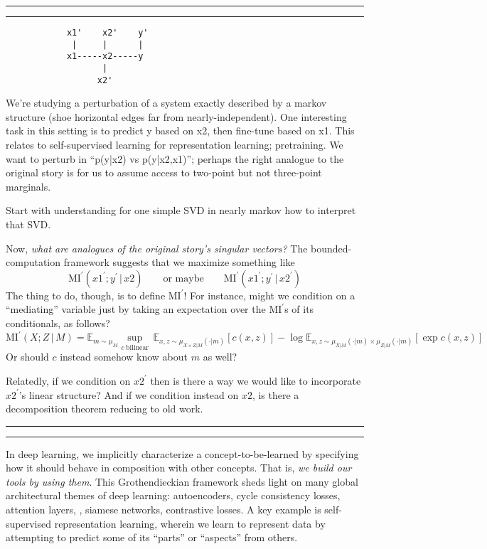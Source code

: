 \documentclass[11pt, justified]{tufte-book}
\newcommand{\pr}{\prime}
\newcommand{\MI}{\text{MI}}
\newcommand{\Ee}{\mathbb{E}}\newcommand{\eE}{\mathcal{E}}
\theoremstyle{definition}
\begin{document}
\vspace{0.5cm}
\hrule
\vspace{0.1cm}
\hrule
\vspace{0.1cm}

    \begin{verbatim}
            x1'    x2'    y'
             |     |      |
            x1-----x2-----y
                   |
                  x2'
    \end{verbatim}
    We're studying a perturbation of a system exactly described by a markov
    structure (shoe horizontal edges far from nearly-independent).  One
    interesting task in this setting is to predict y based on x2, then
    fine-tune based on x1.  This relates to self-supervised learning for
    representation learning; pretraining.  
    We want to perturb in ``p(y|x2) vs p(y|x2,x1)''; perhaps the right analogue
    to the original story is for us to assume access to two-point but not
    three-point marginals.

    Start with understanding for one simple SVD in nearly markov how to
    interpret that SVD.

    Now, \emph{what are analogues of the original story's singular vectors?}
    The bounded-computation framework suggests that we maximize something like
    $$
        \MI^\pr(x1^\pr;y^\pr \,|\, x2)
        \quad
        \quad
        \text{or maybe}
        \quad
        \quad
        \MI^\pr(x1^\pr;y^\pr \,|\, x2^\pr)
    $$
    The thing to do, though, is to define $\MI^\pr$!
    For instance, might we condition on a ``mediating'' variable just by taking
    an expectation over the $\MI^\pr$s of its conditionals, as follows?
    $$
      \MI^\pr(X;Z\,|\,M) = \Ee_{m\sim \mu_{M}} \sup_{c~\text{bilinear}}\,
      \Ee_{x,z \sim \mu_{X\times Z|M}(\cdot|m)} \left[
        c(x,z)
      \right]
      -
      \log
      \Ee_{x,z \sim \mu_{X|M}(\cdot|m) \times \mu_{Z|M}(\cdot|m)} \left[
      \exp
        c(x,z)
      \right]
    $$
    Or should $c$ instead somehow know about $m$ as well?

    Relatedly, if we condition on $x2^\pr$ then is there a way we would
    like to incorporate $x2^\pr$'s linear structure?
    And if we condition instead on $x2$, is there a decomposition theorem reducing to old work.


\vspace{0.1cm}
\hrule
\vspace{0.1cm}
\hrule
\vspace{0.5cm}


  In deep learning, we implicitly characterize a concept-to-be-learned by
  specifying how it should behave in composition with other concepts.  That is,
  \emph{we build our tools by using them}.  This Grothendieckian framework
  sheds light on many global architectural themes of deep learning:
  autoencoders, cycle consistency losses, attention layers, , siamese networks,
  contrastive losses.  A key example is self-supervised representation
  learning, wherein we learn to represent data by attempting to predict some
  of its ``parts'' or ``aspects'' from others. 
\end{document}
